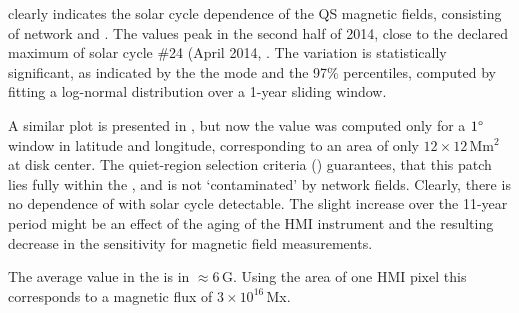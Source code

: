 \documentclass{aa}
\begin{document}
 clearly indicates the solar cycle dependence of the 
QS
magnetic fields, consisting of network and \IN{}. The \brms{} values peak in the second half of 2014, close to the declared maximum of 
solar cycle \#24 (April 2014, . The variation is statistically significant, as indicated by the the mode and the 97\% percentiles, computed by fitting a log-normal distribution over a 1-year sliding window.

A similar plot is presented in , but now the \brms{} value was computed only for a $1\degree$ window in latitude and longitude, corresponding to an area of only $12\times 12$\,Mm$^2$ at disk center. The quiet-region selection criteria () guarantees, that this patch lies fully within the \IN{}, and is not `contaminated' by network fields. Clearly, there is no dependence of \brms{} with solar cycle detectable. The 
slight increase over the 11-year period might be an effect of the aging of the HMI instrument and the resulting decrease in the sensitivity for magnetic field measurements.

The average \brms{} value in the \IN{} is in $\approx6$\,G. Using the area of one HMI pixel this corresponds to a magnetic flux of $3\times 10^{16}$\,Mx. 



\end{document}
